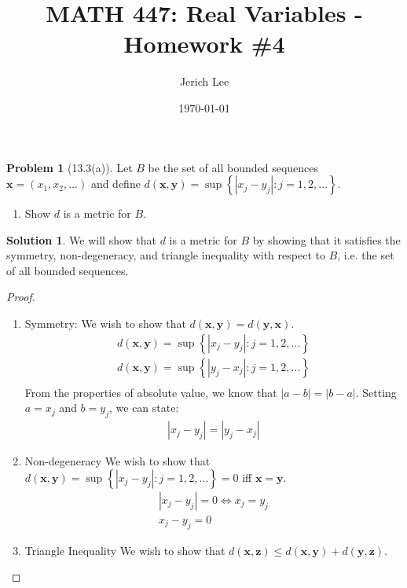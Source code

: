 \documentclass[12pt]{article}
\title{MATH 447: Real Variables - Homework \#4}
\author{Jerich Lee}
\date{\today}
\theoremstyle{definition} %
\newtheorem{solution}{Solution}
\newtheorem{problem}{Problem}
\theoremstyle{plain} %
\begin{document}
\maketitle

\begin{problem}[13.3(a)]
Let $B$ be the set of all bounded sequences $\mathbf{x} = (x_{1}, x_{2}, \ldots)$ and define $d(\mathbf{x}, \mathbf{y})=\sup \left\{ \left\vert x_{j}-y_{j}  \right\vert :j=1,2, \ldots   \right\} $.
\begin{enumerate}
    \item Show $d$ is a metric for $B$. 
\end{enumerate}
\end{problem}

\begin{solution}
We will show that $d$ is a metric for $B$ by showing that it satisfies the symmetry, non-degeneracy, and triangle inequality with respect to $B$, i.e. the set of all bounded sequences.
\begin{proof}
 \begin{enumerate}
    \item Symmetry: 
    We wish to show that $d(\mathbf{x}, \mathbf{y})=d(\mathbf{y}, \mathbf{x})$.  \begin{align} d(\mathbf{x}, \mathbf{y}) = \sup\left\{ \left\vert x_{j}-y_{j} \right\vert : j=1,2, \ldots   \right\} \\[10pt]  d(\mathbf{x}, \mathbf{y}) = \sup\left\{ \left\vert y_{j}-x_{j} \right\vert : j=1,2, \ldots   \right\} \\[10pt] \end{align} From the properties of absolute value, we know that $\left\vert a-b \right\vert = \left\vert b-a \right\vert $. Setting $a=x_{j}$ and $b=y_{j} $, we can state: \begin{align} \left\vert x_{j} -y_{j}  \right\vert =\left\vert y_{j} -x_{j}  \right\vert \end{align} \item Non-degeneracy We wish to show that $d(\mathbf{x},\mathbf{y} )=\sup \left\{ \left\vert x_{j}-y_{j}  \right\vert : j=1,2, \ldots   \right\}=0 $ iff $\mathbf{x} =\mathbf{y} $.
   \begin{align}
    \left\vert x_{j} -y_{j}  \right\vert =0  \iff x_{j} =y_{j} \\[10pt] 
    x_{j} -y_{j} =0    
   \end{align}
   \item Triangle Inequality
   We wish to show that $d(\mathbf{x}, \mathbf{z})\leq d(\mathbf{x},\mathbf{y})+d(\mathbf{y}, \mathbf{z})$.

\end{enumerate}
\end{proof}
\end{solution}
\end{document}
